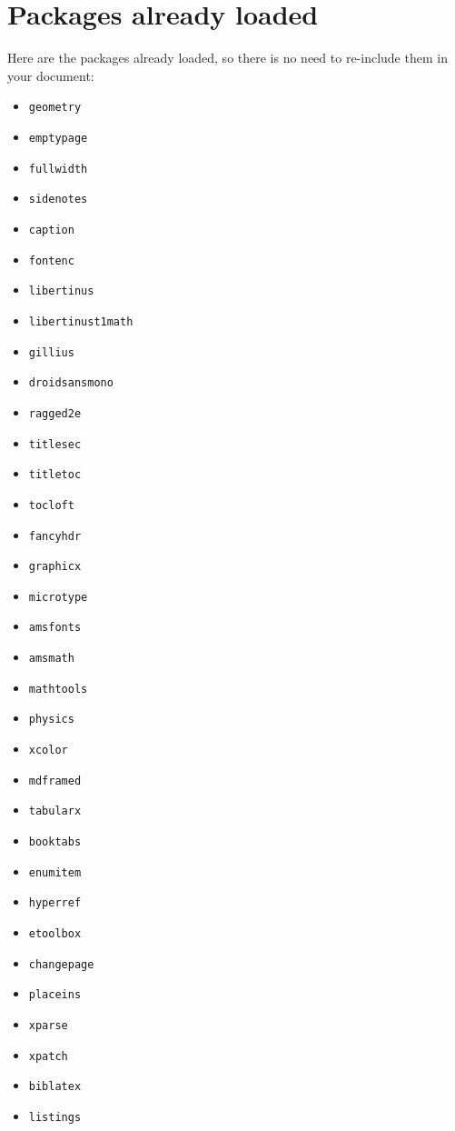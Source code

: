 \documentclass[
    11pt,
]{tufte-style-thesis}
\begin{document}
\section{Packages already loaded}

Here are the packages already loaded, so there is no need to re-include them in your document:

\begin{wide}
\begin{multicols}{4}
\begin{itemize}
\item\texttt{geometry}
\item\texttt{emptypage}
\item\texttt{fullwidth}
\item\texttt{sidenotes}
\item\texttt{caption}
\item\texttt{fontenc}
\item\texttt{libertinus}
\item\texttt{libertinust1math}
\item\texttt{gillius}
\item\texttt{droidsansmono}
\item\texttt{ragged2e}
\item\texttt{titlesec}
\item\texttt{titletoc}
\item\texttt{tocloft}
\item\texttt{fancyhdr}
\item\texttt{graphicx} \item\texttt{microtype} \item\texttt{amsfonts} \item\texttt{amsmath} \item\texttt{mathtools} \item\texttt{physics} \item\texttt{xcolor} \item\texttt{mdframed} \item\texttt{tabularx} \item\texttt{booktabs} \item\texttt{enumitem} \item\texttt{hyperref} \item\texttt{etoolbox} \item\texttt{changepage} \item\texttt{placeins} \item\texttt{xparse} \item\texttt{xpatch} \item\texttt{biblatex} \item\texttt{listings}
\end{itemize}
\end{multicols}
\end{wide}
\end{document}
